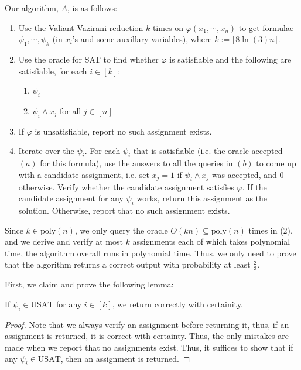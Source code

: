 \documentclass[12pt]{article}
\begin{document}
\begin{solution}
    Our algorithm, $A$, is as follows: 
    \begin{enumerate}
        \item Use the Valiant-Vazirani reduction $k$ times on $\varphi(x_1, \cdots, x_n)$ to get formulae $\psi_1, \cdots, \psi_k$ (in $x_i$'s and some auxillary variables), where $k := \lceil 8\ln(3)n\rceil$.
        \item Use the oracle for SAT to find whether $\varphi$ is satisfiable and the following are satisfiable, for each $i \in [k]$: 
        \begin{enumerate}
            \item $\psi_i$
            \item $\psi_i \land x_j$ for all $j \in [n]$
        \end{enumerate}
        \item If $\varphi$ is unsatisfiable, report no such assignment exists. 
        \item Iterate over the $\psi_i$. For each $\psi_i$ that is satisfiable (i.e. the oracle accepted $(a)$ for this formula), use the answers to all the queries in $(b)$ to come up with a candidate assignment, i.e. set $x_j = 1$ if $\psi_i \land x_j$ was accepted, and $0$ otherwise. Verify whether the candidate assignment satisfies $\varphi$. If the candidate assignment for any $\psi_i$ works, return this assignment as the solution. Otherwise, report that no such assignment exists.  
    \end{enumerate}
    Since $k \in \text{poly}(n)$, we only query the oracle $O(kn) \subseteq \text{poly}(n)$ times in (2), and we derive and verify at most $k$ assignments each of which takes polynomial time, the algorithm overall runs in polynomial time. Thus, we only need to prove that the algorithm returns a correct output with probability at least $\frac{2}{3}$. \bbni

    First, we claim and prove the following lemma: 
    \begin{lemma}
        If $\psi_i \in \text{USAT}$ for any $i \in [k]$, we return correctly with certainity.
    \end{lemma}
    \begin{proof}
        Note that we always verify an assignment before returning it, thus, if an assignment is returned, it is correct with certainty. Thus, the only mistakes are made when we report that no assignments exist. Thus, it suffices to show that if any $\psi_i \in \text{USAT}$, then an assignment is returned. \bbni 


\end{proof}
\end{solution}
\end{document}
